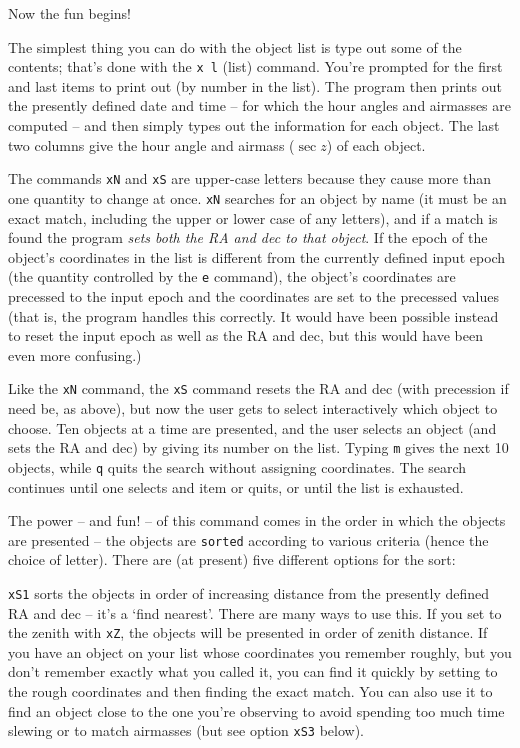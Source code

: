 Now the fun begins!  

The simplest thing you can do with the object list
is type out some of the contents; that's done with the {\tt x l} 
(list) command.  You're prompted for the first and last items to 
print out (by number in the list). The program then prints out the
presently defined date and time -- for which the hour angles and
airmasses are computed -- and then simply types
out the information for each object.  The last two columns give the 
hour angle and airmass ($\sec z$) of each object.

The commands {\tt xN} and {\tt xS} are upper-case letters because
they cause more than one quantity to change at once.  {\tt xN}
searches for an object by name (it must be an exact match, including
the upper or lower case of any letters), and
if a match is found the program {\it sets both the RA and dec to that object}.
If the epoch of the object's coordinates in the list is different from the 
currently defined input epoch (the quantity controlled by the {\tt e}
command), the object's coordinates are precessed 
to the input epoch and the coordinates are set to the precessed values
(that is, the program handles this correctly.
It would have been possible instead
to reset the input epoch as well as the RA and dec, but this
would have been even more confusing.)

Like the {\tt xN} command, the {\tt xS} command resets the RA and dec
(with precession if need be, as above),
but now the user gets to select interactively which object to choose.
Ten objects at a time are presented, and
the user selects an object (and sets the RA and dec) by giving its number
on the list.  Typing {\tt m} gives the next 10 objects, while {\tt q}
quits the search without assigning coordinates.  The search continues
until one selects and item or quits, or until the list is exhausted. 

The power -- and fun! -- of this command comes in the order in which the
objects are presented -- the objects are {\tt sorted} according to various 
criteria (hence the choice of letter). 
There are (at present) five different options for the sort:

\item{\tt xS1} sorts the objects in order of increasing distance from the
presently defined RA and dec -- it's  a `find nearest'.  There are 
many ways to use this.  If you set to the
zenith with {\tt xZ}, the objects will be presented in order of
zenith distance.  If you have an object on your list whose coordinates
you remember roughly, but you don't remember exactly what you called it,
you can find it quickly by setting to the rough coordinates and then 
finding the exact match.  You can also use it to find an object close to
the one you're observing to avoid spending too much time slewing or
to match airmasses (but see option {\tt xS3} below).


